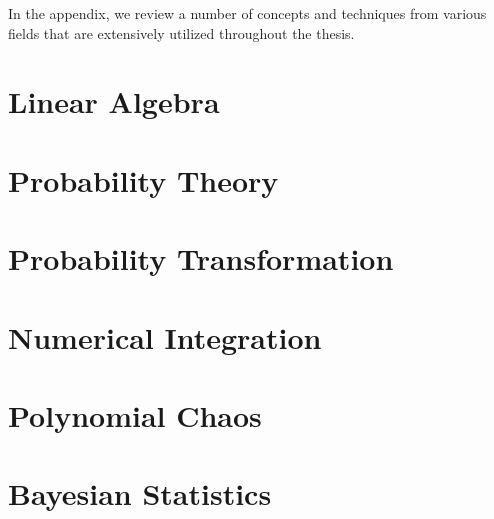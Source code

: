 In the appendix, we review a number of concepts and techniques from various
fields that are extensively utilized throughout the thesis.

\section{Linear Algebra}

\section{Probability Theory}

\section{Probability Transformation}

\section{Numerical Integration}

\section{Polynomial Chaos}

\section{Bayesian Statistics}
